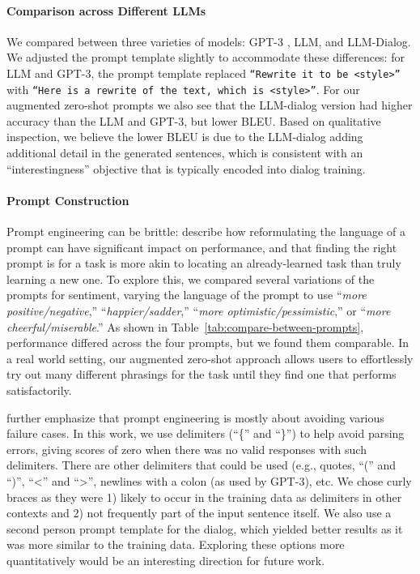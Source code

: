 

\paragraph{Comparison across Different LLMs}
We compared between three varieties of models: GPT-3 \citep{DBLP:journals/corr/abs-2005-14165}, LLM, and  LLM-Dialog. We adjusted the prompt template slightly to accommodate these differences: for  LLM and GPT-3, the prompt template replaced {\small
\texttt{``Rewrite it to be \textbf{<style>}''}
with \small \texttt{``Here is a rewrite of the text, which is \textbf{<style>}''}.}
For our augmented zero-shot prompts we also see that the LLM-dialog version had higher accuracy than the LLM and GPT-3, but lower BLEU. Based on qualitative inspection, we believe the lower BLEU is due to the LLM-dialog adding additional detail in the generated sentences, which is consistent with an ``interestingness'' objective that is typically encoded into dialog training. 


\paragraph{Prompt Construction}
\label{sec:prompt-selection}
Prompt engineering can be brittle: \citet{reynolds2021prompt} describe how reformulating the language of a prompt can have significant impact on performance, and that finding the right prompt is for a task is more akin to locating an already-learned task than truly learning a new one.
To explore this, we compared several variations of the prompts for sentiment, varying the language of the prompt to use ``\textit{more {positive/negative}},'' ``\textit{{happier/sadder}},''
``\textit{more {optimistic/pessimistic}},'' or
``\textit{more {cheerful/miserable}}.''
As shown in Table~\ref{tab:compare-between-prompts}, performance differed across the four prompts, but we found them comparable.
In a real world setting, our augmented zero-shot approach allows users to effortlessly try out many different phrasings for the task until they find one that performs satisfactorily.



\citet{reynolds2021prompt} further emphasize that prompt engineering is mostly about avoiding various failure cases.
 In this work, we use delimiters (``\{'' and ``\}'') to help avoid parsing errors, giving scores of zero when there was no valid responses with such delimiters. There are other delimiters that could be used (e.g., quotes, ``('' and ``)'', ``<'' and ``>'', newlines with a colon (as used by GPT-3), etc. We chose curly braces as they were 1) likely to occur in the training data as delimiters in other contexts and 2) not frequently part of the input sentence itself. We also use a second person prompt template for the dialog, which yielded better results as it was more similar to the training data. Exploring these options more quantitatively would be an interesting direction for future work.

